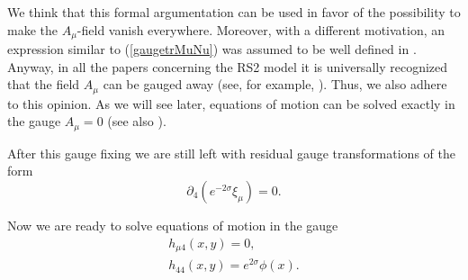 \documentclass[a4paper,12pt]{article}
\begin{document}
We think that this formal argumentation can be used in favor of the
possibility to make the $A_{\mu}$-field vanish  everywhere. Moreover, with
a different motivation, an expression similar to  (\ref{gaugetrMuNu}) was
assumed to be well defined in \cite{AIMVV}. Anyway, in all the papers
concerning the RS2 model it is universally recognized that the field
$A_{\mu}$ can be gauged away (see, for example, \cite{Kakushadze}). Thus,
we also adhere to this opinion. As we will see later, equations of motion
can be solved exactly in the gauge $A_{\mu}= 0$ (see also
\cite{Kakushadze}).

After this gauge fixing we are still left with residual gauge
transformations of the form
\begin{equation}\label{remgaugetr}
\partial_{4}\left(e^{-2\sigma}\xi_{\mu}\right)=0.
\end{equation}

Now we are ready to solve equations of motion in the gauge
\begin{eqnarray}\label{unitgauge}
h_{\mu4}(x,y)= 0, \\ \nonumber
h_{44}(x,y)=e^{2\sigma}\phi(x).
\end{eqnarray}
\end{document}
